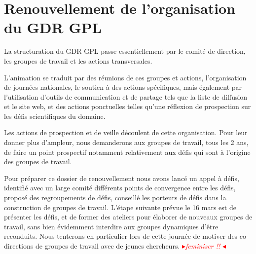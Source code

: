 \documentclass[11pt]{article}
\newcommand{\mynote}[3][black]{\textcolor{#1}{\fbox{\bfseries\sffamily\scriptsize{#2}}
{\small$\blacktriangleright$\textsf{\emph{#3}}$\blacktriangleleft$}}}
\newcommand{\pem}[1]{} %
\newcommand{\TODO}[1]{\mynote[red]{TODO}{#1}}
\begin{document}



\section{Renouvellement de l'organisation du GDR GPL}\label{organisation}

La structuration du GDR GPL passe essentiellement 
par le comité de direction, les groupes de travail et les actions transversales.


L'animation se traduit 
    par des réunions de ces groupes et actions,  
    l'organisation de journées nationales, 
    le soutien à des actions spécifiques, 
    mais également par l'utilisation d'outils de communication
    et de partage tels que la liste de diffusion et le site web, et des actions ponctuelles telles qu'une réflexion de prospection sur les défis scientifiques du domaine. 

Les actions de prospection et de veille découlent de cette organisation. Pour leur donner plus d'ampleur, nous demanderons aux groupes de travail, tous les 2 ans, de faire un point prospectif notamment relativement aux défis qui sont à l'origine des groupes de travail.


Pour préparer ce dossier de renouvellement nous avons lancé un appel à défis, identifié avec un large comité différents points de convergence entre les défis, proposé des regroupements de défis, conseillé les porteurs de défis dans la construction de groupes de travail. L'étape suivante prévue le 16 mars est de présenter les défis, et de former des ateliers pour élaborer de nouveaux groupes de travail, sans bien évidemment interdire aux groupes dynamiques d'être reconduits. Nous tenterons en particulier lors de cette journée de motiver des co-directions de groupes de travail avec de jeunes chercheurs.
\TODO{feminiser !! }
\end{document}
